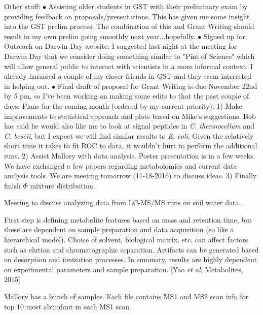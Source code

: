\documentclass[11pt]{labbook}
\begin{document}
Other stuff: \newline
$\bullet$ Assisting older students in GST with their preliminary exam by providing feedback on proposals/presentations. This has given me some insight into the GST prelim process. The combination of this and Grant Writing should result in my own prelim going smoothly next year...hopefully. \newline
$\bullet$ Signed up for Outreach on Darwin Day website. I suggested last night at the meeting for Darwin Day that we consider doing something similar to "Pint of Science" which will allow general public to interact with scientists in a more informal context. I already harassed a couple of my closer friends in GST and they seem interested in helping out.
$\bullet$ Final draft of proposal for Grant Writing is due November 22nd by 5 pm, so I've been working on making some edits to that the past couple of days.
\newline
Plans for the coming month (ordered by my current priority):
1) Make improvements to statistical approach and plots based on Mike's suggestions. Bob has said he would also like me to look at signal peptides in \textit{C. thermocellum} and \textit{C. bescii}, but I expect we will find similar results to \textit{E. coli}. Given the relatively short time it takes to fit ROC to data, it wouldn't hurt to perform the additional runs.   
2) Assist Mallory with data analysis. Poster presentation is in a few weeks. We have exchanged a few papers regarding metabolomics and current data analysis tools. We are meeting tomorrow (11-18-2016) to discuss ideas.
3) Finally finish $\Phi$ mixture distribution. 




Meeting to discuss analyzing data from LC-MS/MS runs on soil water data.

First step is defining metabolite features based on mass and retention time, but these are dependent on sample preparation and data acquisition (so like a hierarchical model). Choice of solvent, biological matrix, etc. can affect factors such as elution and chromatographic separation. Artifacts can be generated based on desorption and ionization processes. In summary, results are highly dependent on experimental parameters and sample preparation. [Yao \textit{et al}, Metabolites, 2015]
\newline

Mallory has a bunch of samples. Each file contains MS1 and MS2 scan info for top 10 most abundant in each MS1 scan. 
\end{document}

